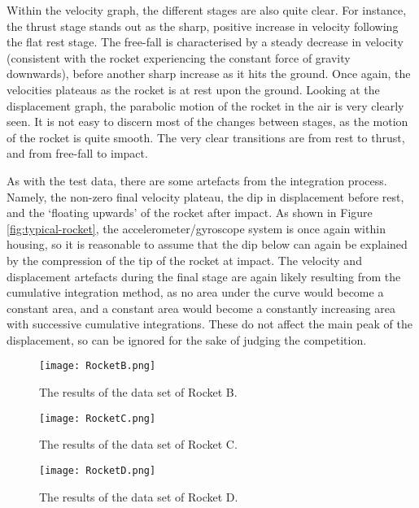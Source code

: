 \documentclass{article}
\begin{document}
        Within the velocity graph, the different stages are also quite clear. For instance, the thrust stage stands out as the sharp, positive increase in velocity following the flat rest stage. The free-fall is characterised by a steady decrease in velocity (consistent with the rocket experiencing the constant force of gravity downwards), before another sharp increase as it hits the ground. Once again, the velocities plateaus as the rocket is at rest upon the ground. Looking at the displacement graph, the parabolic motion of the rocket in the air is very clearly seen. It is not easy to discern most of the changes between stages, as the motion of the rocket is quite smooth. The very clear transitions are from rest to thrust, and from free-fall to impact.  

        As with the test data, there are some artefacts from the integration process. Namely, the non-zero final velocity plateau, the dip in displacement before rest, and the `floating upwards' of the rocket after impact. As shown in Figure \ref{fig:typical-rocket}, the accelerometer/gyroscope system is once again within housing, so it is reasonable to assume that the dip below can again be explained by the compression of the tip of the rocket at impact. The velocity and displacement artefacts during the final stage are again likely resulting from the cumulative integration method, as no area under the curve would become a constant area, and a constant area would become a constantly increasing area with successive cumulative integrations. These do not affect the main peak of the displacement, so can be ignored for the sake of judging the competition.

        \begin{figure}[H]
            \centering
            \texttt{[image: RocketB.png]}
            \caption{The results of the data set of Rocket B.}
            \label{fig:RocketB}
        \end{figure}

        \begin{figure}[H]
            \centering
            \texttt{[image: RocketC.png]}
            \caption{The results of the data set of Rocket C.}
            \label{fig:RocketC}
        \end{figure}

        \begin{figure}[H]
            \centering
            \texttt{[image: RocketD.png]}
            \caption{The results of the data set of Rocket D.}
            \label{fig:RocketD}
        \end{figure}
\end{document}

